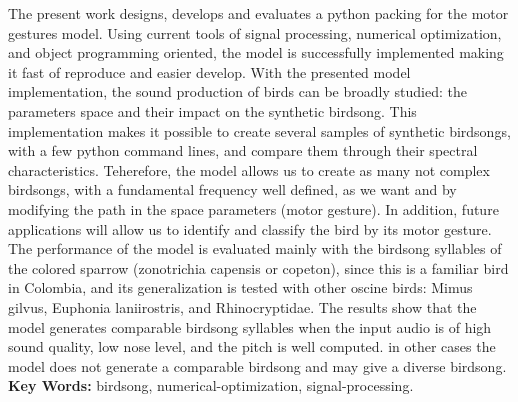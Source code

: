 The present work designs, develops and evaluates a python packing for the motor gestures model. Using current tools of signal processing, numerical optimization, and object programming oriented, the model is successfully implemented making it fast of reproduce and easier develop. With the presented model implementation, the sound production of birds can be broadly studied: the parameters space and their impact on the synthetic birdsong. This implementation makes it possible to create several samples of synthetic birdsongs, with a few python command lines, and compare them through their spectral characteristics. Teherefore, the model allows us to create as many not complex birdsongs, with a fundamental frequency well defined, as we want and by modifying the path in the space parameters (motor gesture). In addition, future applications will allow us to identify and classify the bird by its motor gesture. \\

The performance of the model is evaluated mainly with the birdsong syllables of the colored sparrow (zonotrichia capensis or copeton), since this is a familiar bird in Colombia, and its generalization is tested with other oscine birds: Mimus gilvus, Euphonia laniirostris, and Rhinocryptidae. The results show that the model generates comparable birdsong syllables when the input audio is of high sound quality, low nose level, and the pitch is well computed. in other cases the model does not generate a comparable birdsong and may give a diverse birdsong. \\

\textbf{\small Key Words:} birdsong, numerical-optimization, signal-processing.